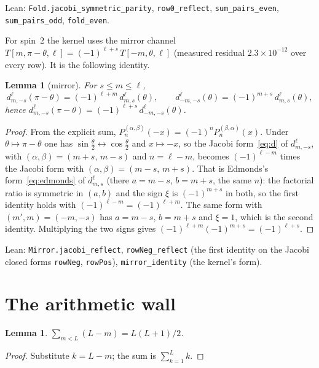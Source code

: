 \documentclass[11pt,a4paper]{article}
\newtheorem{lemma}[theorem]{Lemma}
\numberwithin{equation}{section}
\begin{document}
Lean: \texttt{Fold.jacobi\_symmetric\_parity}, \texttt{row0\_reflect},
\texttt{sum\_pairs\_even}, \texttt{sum\_pairs\_odd}, \texttt{fold\_even}.

For spin~$2$ the kernel uses the mirror channel
$T[m,\pi-\theta,\ell]=(-1)^{\ell+s}\,T[-m,\theta,\ell]$ (measured residual
$2.3\times 10^{-12}$ over every row).  It is the following identity.

\begin{lemma}[mirror]
\label{lem:mirror}
For $s\le m\le\ell$,
\begin{equation}
\label{eq:mirror}
d^\ell_{m,-s}(\pi-\theta)=(-1)^{\ell+m}\,d^\ell_{m,s}(\theta),
\qquad
d^\ell_{-m,-s}(\theta)=(-1)^{m+s}\,d^\ell_{m,s}(\theta),
\end{equation}
hence $d^\ell_{m,-s}(\pi-\theta)=(-1)^{\ell+s}\,d^\ell_{-m,-s}(\theta)$.
\end{lemma}

\begin{proof}
From the explicit sum, $P_n^{(\alpha,\beta)}(-x)=(-1)^nP_n^{(\beta,\alpha)}(x)$.
Under $\theta\mapsto\pi-\theta$ one has $\sin\frac{\theta}{2}\leftrightarrow
\cos\frac{\theta}{2}$ and $x\mapsto -x$, so the Jacobi form~\eqref{eq:d} of
$d^\ell_{m,-s}$, with $(\alpha,\beta)=(m+s,\,m-s)$ and $n=\ell-m$, becomes
$(-1)^{\ell-m}$ times the Jacobi form with $(\alpha,\beta)=(m-s,\,m+s)$.
That is Edmonds's form~\eqref{eq:edmonds} of $d^\ell_{m,s}$ (there
$a=m-s$, $b=m+s$, the same $n$): the factorial ratio is symmetric in
$(a,b)$ and the sign $\xi$ is $(-1)^{m+s}$ in both, so the first identity
holds with $(-1)^{\ell-m}=(-1)^{\ell+m}$.  The same form with
$(m',m)=(-m,-s)$ has $a=m-s$, $b=m+s$ and $\xi=1$, which is the second
identity.  Multiplying the two signs gives $(-1)^{\ell+m}(-1)^{m+s}=(-1)^{\ell+s}$.
\end{proof}

Lean: \texttt{Mirror.jacobi\_reflect}, \texttt{rowNeg\_reflect} (the first
identity on the Jacobi closed forms \texttt{rowNeg}, \texttt{rowPos}),
\texttt{mirror\_identity} (the kernel's form).

\section{The arithmetic wall}
\label{sec:wall}

\begin{lemma}
\label{lem:live}
$\sum_{m<L}(L-m)=L(L+1)/2$.
\end{lemma}

\begin{proof}
Substitute $k=L-m$; the sum is $\sum_{k=1}^{L}k$.
\end{proof}
\end{document}
